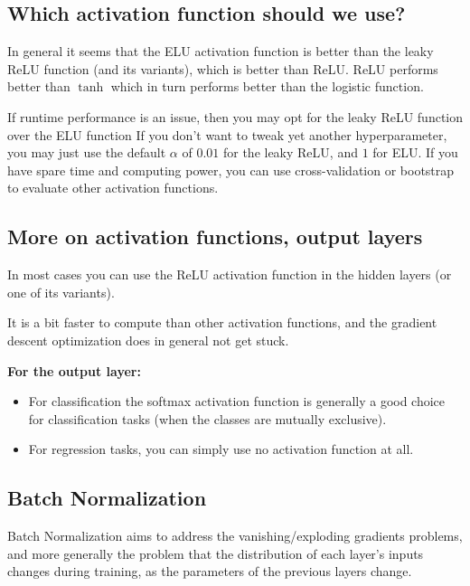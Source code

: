 \documentclass[%
oneside,                 %
final,                   %
10pt]{article}
\begin{document}
\subsection{Which activation function should we use?}

In general it seems that the ELU activation function is better than
the leaky ReLU function (and its variants), which is better than
ReLU. ReLU performs better than $\tanh$ which in turn performs better
than the logistic function.

If runtime performance is an issue, then you may opt for the leaky
ReLU function over the ELU function If you don’t want to tweak yet
another hyperparameter, you may just use the default $\alpha$ of
$0.01$ for the leaky ReLU, and $1$ for ELU. If you have spare time and
computing power, you can use cross-validation or bootstrap to evaluate
other activation functions.

\subsection{More on activation functions, output layers}

In most cases you can use the ReLU activation function in the hidden
layers (or one of its variants).

It is a bit faster to compute than other activation functions, and the
gradient descent optimization does in general not get stuck.

\textbf{For the output layer:}

\begin{itemize}
\item For classification the softmax activation function is generally a good choice for classification tasks (when the classes are mutually exclusive).

\item For regression tasks, you can simply use no activation function at all.
\end{itemize}

\noindent
\subsection{Batch Normalization}

Batch Normalization aims to address the vanishing/exploding gradients
problems, and more generally the problem that the distribution of each
layer’s inputs changes during training, as the parameters of the
previous layers change.
\end{document}

